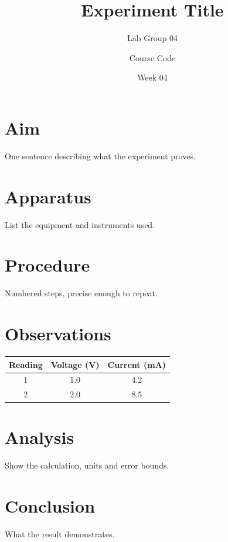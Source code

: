 \documentclass[11pt]{article}
\title{Experiment Title}
\author{Lab Group 04 \and Course Code}
\date{Week 04}
\begin{document}
\maketitle

\section{Aim}
One sentence describing what the experiment proves.

\section{Apparatus}
List the equipment and instruments used.

\section{Procedure}
Numbered steps, precise enough to repeat.

\section{Observations}
\begin{tabular}{ccc}
\toprule
Reading & Voltage (V) & Current (mA) \\
\midrule
1 & 1.0 & 4.2 \\
2 & 2.0 & 8.5 \\
\bottomrule
\end{tabular}

\section{Analysis}
Show the calculation, units and error bounds.

\section{Conclusion}
What the result demonstrates.
\end{document}
